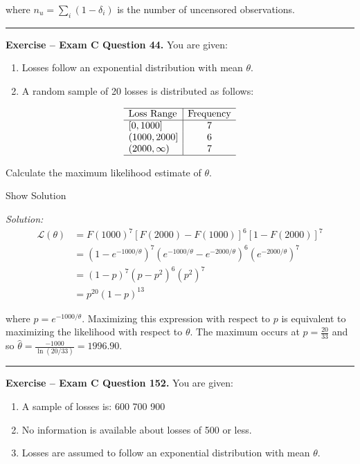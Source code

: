 \documentclass[]{book}
\providecommand{\tightlist}{%
  \setlength{\itemsep}{0pt}\setlength{\parskip}{0pt}}
\theoremstyle{definition}
\theoremstyle{definition}
\theoremstyle{definition}
\theoremstyle{remark}
\begin{document}
where \(n_u = \sum_i (1-\delta_i)\) is the number of uncensored
observations.

\begin{center}\rule{0.5\linewidth}{\linethickness}\end{center}

\textbf{Exercise -- Exam C Question 44.} You are given:

\begin{enumerate}
\def\labelenumi{(\roman{enumi})}
\tightlist
\item
  Losses follow an exponential distribution with mean \(\theta\).
\item
  A random sample of 20 losses is distributed as follows:
\end{enumerate}

\[\begin{array}{l|c}
\hline
\text{Loss Range} & \text{Frequency} \\
\hline 
[0,1000] & 7 \\
(1000,2000] & 6 \\
(2000,\infty) & 7 \\
\hline
\end{array}\]

Calculate the maximum likelihood estimate of \(\theta\).

Show Solution

\hypertarget{toggleExamC44}{}
\emph{Solution:} \[\begin{aligned}
\mathcal{L}(\theta) &= F(1000)^7[F(2000)-F(1000)]^6[1-F(2000)]^7 \\
&= (1-e^{-1000/\theta})^7(e^{-1000/\theta} - e^{-2000/\theta})^6(e^{-2000/\theta})^7 \\
&= (1-p)^7(p-p^2)^6(p^2)^7 \\
&= p^{20}(1-p)^{13}
\end{aligned}\]

where \(p=e^{-1000/\theta}\). Maximizing this expression with respect to
\(p\) is equivalent to maximizing the likelihood with respect to
\(\theta\). The maximum occurs at \(p=\frac{20}{33}\) and so
\(\hat{\theta}=\frac{-1000}{\ln(20/33)}= 1996.90\).

\begin{center}\rule{0.5\linewidth}{\linethickness}\end{center}

\textbf{Exercise -- Exam C Question 152.} You are given:

\begin{enumerate}
\def\labelenumi{(\roman{enumi})}
\tightlist
\item
  A sample of losses is: 600 700 900
\item
  No information is available about losses of 500 or less.
\item
  Losses are assumed to follow an exponential distribution with mean
  \(\theta\).
\end{enumerate}
\end{document}
